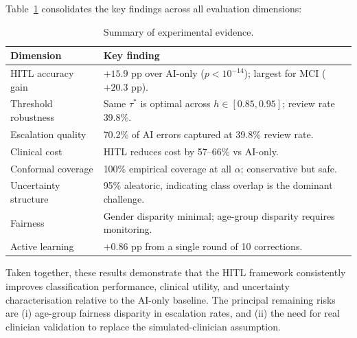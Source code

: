 \documentclass[12pt, a4paper]{report}
\begin{document}
  Table~\ref{tab:evidence-summary} consolidates the key findings across all
  evaluation dimensions:

  \begin{table}[htbp]
    \centering
    \caption{Summary of experimental evidence.}
    \label{tab:evidence-summary}
    \begin{tabular}{p{3.8cm}p{8.5cm}}
      \toprule
      \textbf{Dimension} & \textbf{Key finding} \\
      \midrule
      HITL accuracy gain & $+15.9$ pp over AI-only ($p < 10^{-14}$);
        largest for MCI ($+20.3$ pp). \\
      Threshold robustness & Same $\tau^*$ is optimal across
        $h \in [0.85, 0.95]$; review rate 39.8\%. \\
      Escalation quality & 70.2\% of AI errors captured at
        39.8\% review rate. \\
      Clinical cost & HITL reduces cost by 57--66\%
        vs AI-only. \\
      Conformal coverage & 100\% empirical coverage at all $\alpha$;
        conservative but safe. \\
      Uncertainty structure & 95\% aleatoric, indicating class overlap
        is the dominant challenge. \\
      Fairness & Gender disparity minimal; age-group disparity
        requires monitoring. \\
      Active learning & $+0.86$ pp from a single round of 10 corrections. \\
      \bottomrule
    \end{tabular}
  \end{table}

  Taken together, these results demonstrate that the HITL framework consistently
  improves classification performance, clinical utility, and uncertainty
  characterisation relative to the AI-only baseline.  The principal remaining risks
  are (i) age-group fairness disparity in escalation rates, and (ii) the need
  for real clinician validation to replace the simulated-clinician assumption.


  
  

  
\end{document}
